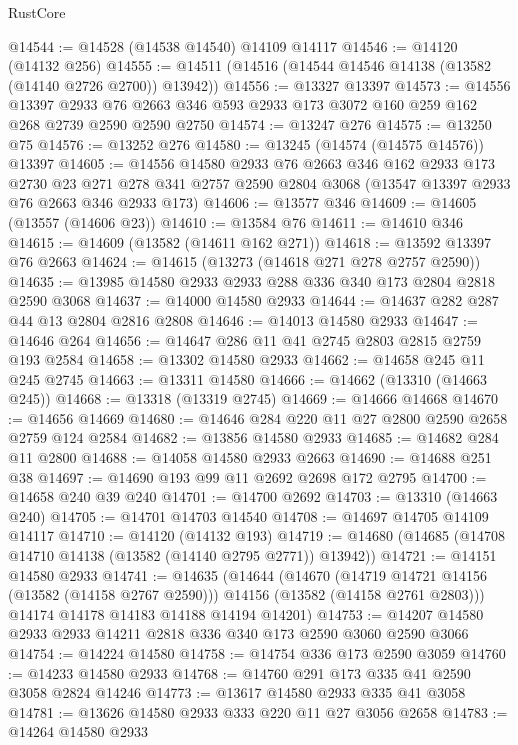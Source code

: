 \begin{lexlean}{RustCore}
\begin{coremodule}
@14544 := @14528 (@14538 @14540) @14109 @14117
@14546 := @14120 (@14132 @256)
@14555 := @14511 (@14516 (@14544 @14546 @14138 (@13582 (@14140 @2726 @2700)) @13942))
@14556 := @13327 @13397
@14573 := @14556
    @13397
    @2933
    @76
    @2663
    @346
    @593
    @2933
    @173
    @3072
    @160
    @259
    @162
    @268
    @2739
    @2590
    @2590
    @2750
@14574 := @13247 @276
@14575 := @13250 @75
@14576 := @13252 @276
@14580 := @13245 (@14574 (@14575 @14576)) @13397
@14605 := @14556
    @14580
    @2933
    @76
    @2663
    @346
    @162
    @2933
    @173
    @2730
    @23
    @271
    @278
    @341
    @2757
    @2590
    @2804
    @3068
    (@13547 @13397 @2933 @76 @2663 @346 @2933 @173)
@14606 := @13577 @346
@14609 := @14605 (@13557 (@14606 @23))
@14610 := @13584 @76
@14611 := @14610 @346
@14615 := @14609 (@13582 (@14611 @162 @271))
@14618 := @13592 @13397 @76 @2663
@14624 := @14615 (@13273 (@14618 @271 @278 @2757 @2590))
@14635 := @13985 @14580 @2933 @2933 @288 @336 @340 @173 @2804 @2818 @2590 @3068
@14637 := @14000 @14580 @2933
@14644 := @14637 @282 @287 @44 @13 @2804 @2816 @2808
@14646 := @14013 @14580 @2933
@14647 := @14646 @264
@14656 := @14647 @286 @11 @41 @2745 @2803 @2815 @2759 @193 @2584
@14658 := @13302 @14580 @2933
@14662 := @14658 @245 @11 @245 @2745
@14663 := @13311 @14580
@14666 := @14662 (@13310 (@14663 @245))
@14668 := @13318 (@13319 @2745)
@14669 := @14666 @14668
@14670 := @14656 @14669
@14680 := @14646 @284 @220 @11 @27 @2800 @2590 @2658 @2759 @124 @2584
@14682 := @13856 @14580 @2933
@14685 := @14682 @284 @11 @2800
@14688 := @14058 @14580 @2933 @2663
@14690 := @14688 @251 @38
@14697 := @14690 @193 @99 @11 @2692 @2698 @172 @2795
@14700 := @14658 @240 @39 @240
@14701 := @14700 @2692
@14703 := @13310 (@14663 @240)
@14705 := @14701 @14703 @14540
@14708 := @14697 @14705 @14109 @14117
@14710 := @14120 (@14132 @193)
@14719 := @14680 (@14685 (@14708 @14710 @14138 (@13582 (@14140 @2795 @2771)) @13942))
@14721 := @14151 @14580 @2933
@14741 := @14635
    (@14644
      (@14670
        (@14719 @14721 @14156 (@13582 (@14158 @2767 @2590)))
        @14156
        (@13582 (@14158 @2761 @2803)))
      @14174
      @14178
      @14183
      @14188
      @14194
      @14201)
@14753 := @14207 @14580 @2933 @2933 @14211 @2818 @336 @340 @173 @2590 @3060 @2590 @3066
@14754 := @14224 @14580
@14758 := @14754 @336 @173 @2590 @3059
@14760 := @14233 @14580 @2933
@14768 := @14760 @291 @173 @335 @41 @2590 @3058 @2824 @14246
@14773 := @13617 @14580 @2933 @335 @41 @3058
@14781 := @13626 @14580 @2933 @333 @220 @11 @27 @3056 @2658
@14783 := @14264 @14580 @2933

\end{coremodule}
\end{lexlean}
